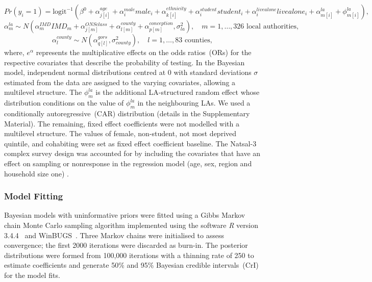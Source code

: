 \documentclass[fleqn,10pt]{wlscirep}
\begin{document}
\begin{equation}
Pr(y_i = 1) = \mbox{logit}^{-1} \left( \beta^0 + \alpha_{j[i]}^{age} + \alpha_i^{male} male_i + \alpha_{k[i]}^{ethnicity} + \alpha_i^{student} student_i + \alpha_i^{livealone} livealone_i + \alpha_{m[i]}^{la} + \phi_{m[i]}^{la} \right),
\end{equation}
\begin{equation}
\alpha_m^{la} \sim N \left( \alpha_m^{IMD} IMD_m + \alpha_{j[m]}^{ONSclass} + \alpha_{l[m]}^{county} + \alpha_{p[m]}^{conception}, \sigma_{la}^2 \right), \quad m = 1,\ldots, 326 \mbox{ local authorities},
\end{equation}
\begin{equation}
\alpha_l^{county} \sim N \left( \alpha_{q[l]}^{gors}, \sigma_{county}^2 \right), \quad l = 1, \ldots, 83 \mbox{ counties},
\end{equation}
\noindent
where, $e^{\alpha}$ represents the multiplicative effects on the odds ratios~(ORs) for the respective covariates that describe the probability of testing. In the Bayesian model, independent normal distributions centred at 0 with standard deviations $\sigma$ estimated from the data are assigned to the varying covariates, allowing a multilevel structure. The $\phi_m^{la}$ is the additional LA-structured random effect whose distribution conditions on the value of $\phi_m^{la}$ in the neighbouring LAs. We used a conditionally autoregressive~(CAR) distribution (details in the Supplementary Material). The remaining, fixed effect coefficients were not modelled with a multilevel structure. The values of female, non-student, not most deprived quintile, and cohabiting were set as fixed effect coefficient baseline.
The Natsal-3 complex survey design was accounted for by including the covariates that have an effect on sampling or nonresponse in the regression model (age, sex, region and household size one) \cite{Gelman2007b}.

\subsubsection*{Model Fitting}
Bayesian models with uninformative priors were fitted using a Gibbs Markov chain Monte Carlo sampling algorithm implemented using the software {\it R} version 3.4.4~\cite{RCoreTeam2017} and WinBUGS~\cite{Lunn2000}. Three Markov chains were initialised to assess convergence; the first 2000 iterations were discarded as burn-in. The posterior distributions were formed from 100,000 iterations with a thinning rate of 250 to estimate coefficients and generate 50\% and 95\% Bayesian credible intervals~(CrI) for the model fits.
\end{document}
